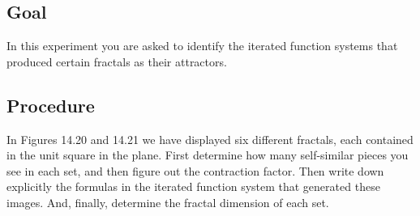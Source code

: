 \documentclass[12pt]{article}
\author{Warren Atkison}
\date{\today}
\begin{document}
\fancyhf{}
\fancyhead[R]{\today}
\fancyfoot[R]{\thepage}

\subsection*{Goal}
In this experiment you are asked to identify the iterated function systems that produced certain fractals as their attractors.

\subsection*{Procedure}
In Figures 14.20 and 14.21 we have displayed six different fractals, each contained in the unit square in the plane. First determine how many self-similar pieces you see in each set, and then figure out the contraction factor. Then write down explicitly the formulas in the iterated function system that generated these images. And, finally, determine the fractal dimension of each set.
\end{document}
